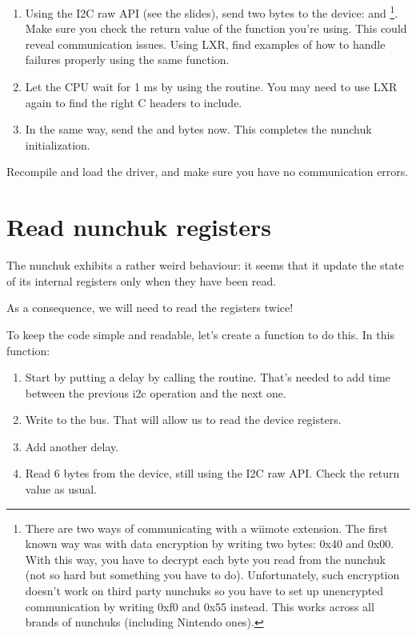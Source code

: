 \begin{enumerate}
\item Using the I2C raw API (see the slides), send two bytes to the
      device:  and 
      \footnote{There are two ways of communicating with a wiimote extension.
        The first known way was with data encryption by writing two
        bytes: 0x40 and 0x00. With this way, you have to decrypt each byte you
        read from the nunchuk (not so hard but something you have to do).
        Unfortunately, such encryption doesn't work on third
        party nunchuks so you have to set up unencrypted communication by
        writing 0xf0 and 0x55 instead. This works across
        all brands of nunchuks (including Nintendo ones).}.
      Make sure you check the return value of 
      the function you're using. This could reveal communication issues.
      Using LXR, find examples of how to handle failures properly using
      the same function.
\item Let the CPU wait for 1 ms by using the  routine.
      You may need to use LXR again to find the right C headers to
      include.
\item In the same way, send the  and  bytes now. 
      This completes the nunchuk initialization.
\end{enumerate}

Recompile and load the driver, and make sure you have no communication
errors.

\section{Read nunchuk registers}

The nunchuk exhibits a rather weird behaviour: it seems that it update
the state of its internal registers only when they have been read.

As a consequence, we will need to read the registers twice!

To keep the code simple and readable, let's create a
 function to do this. In this function:

\begin{enumerate}
\item Start by putting a  delay by calling the
       routine. That's needed to add time between the
      previous i2c operation and the next one.
\item Write  to the bus. That will allow us to read
      the device registers.
\item Add another  delay.
\item Read 6 bytes from the device, still using the I2C raw API.
      Check the return value as usual. 
\end{enumerate}

